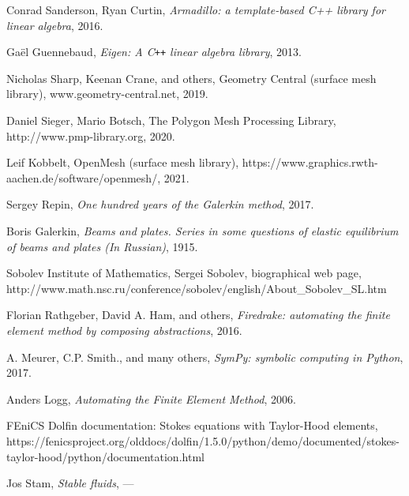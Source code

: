 \documentclass[11pt,a4paper]{memoir}
\begin{document}
\begin{thebibliography}{9}
Conrad Sanderson, Ryan Curtin,
\textit{Armadillo: a template-based C++ library for linear algebra},
2016.

Ga\"el Guennebaud,
\textit{Eigen: A C\texttt{++} linear algebra library},
2013.

Nicholas Sharp, Keenan Crane, and others,
Geometry Central (surface mesh library), www.geometry-central.net,
2019.

Daniel Sieger, Mario Botsch,
The Polygon Mesh Processing Library,
http://www.pmp-library.org,
2020.

Leif Kobbelt,
OpenMesh (surface mesh library),
https://www.graphics.rwth-aachen.de/software/openmesh/,
2021.

Sergey Repin,
\textit{One hundred  years of the Galerkin method},
2017.

Boris Galerkin,
\textit{Beams and plates. Series in some questions of elastic equilibrium of beams and plates (In Russian)},
1915.

Sobolev Institute of Mathematics,
Sergei Sobolev, biographical web page,
http://www.math.nsc.ru/conference/sobolev/english/About\_Sobolev\_SL.htm

Florian Rathgeber, David A. Ham, and others,
\textit{Firedrake: automating the finite element method by composing abstractions},
2016.


A. Meurer, C.P. Smith., and many others,
\textit{SymPy: symbolic computing in Python},
2017.

Anders Logg,
\textit{Automating the Finite Element Method},
2006.

FEniCS Dolfin documentation: Stokes equations with Taylor-Hood elements,
https://fenicsproject.org/olddocs/dolfin/1.5.0/python/demo/documented/stokes-taylor-hood/python/documentation.html

Jos Stam,
\textit{Stable fluids},
---

\end{thebibliography}
\end{document}
